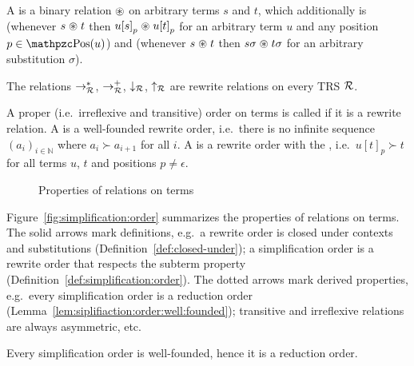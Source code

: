 %
\begin{definition}\label{def:closed-under}
	A  is a binary relation
	\( \mathrel{\circledast} \) on arbitrary terms \( s \) and \( t \),
	which additionally is 
	(whenever \( s\mathrel{\circledast} t \) then \( u{[s]}_p\mathrel{\circledast} u{[t]}_p \)
	for an arbitrary term \( u \) and any position \( p\in\pos(u) \))
	and 
	(whenever \( s\mathrel{\circledast} t \) then \( s\sigma\mathrel{\circledast} t\sigma \)
	for an arbitrary substitution \( \sigma \)).
\end{definition}
\begin{lemma}
	The relations \( \rightarrow^*_{\mathcal{R}} \),
	\( \rightarrow^+_{\mathcal{R}} \),
	\( \downarrow_{\mathcal{R}} \), \( \uparrow_{\mathcal{R}} \) are rewrite relations on every TRS \( \mathcal{R} \).
\end{lemma}
\begin{definition}\label{def:simplification:order}
	A proper (i.e.~irreflexive and transitive) order on terms is called  if it is a rewrite relation.
	A  is a well-founded rewrite order,
	i.e.~there is no infinite sequence
	\( {(a_i)}_{i\in\mathbb{N}} \)
	where \( a_i\succ a_{i+1} \) for all \( i \).
	A  is a rewrite order with the ,
	i.e.~\( u{[t]}_p \succ t \) for all terms \( u \), \( t \) and positions \( p\neq\epsilon \).
\end{definition}

\begin{figure}[htb]\label{fig:simplification:order}
	
	\caption{Properties of relations on terms}
\end{figure}

Figure~\vref{fig:simplification:order} summarizes the properties of relations on terms.
The solid arrows mark definitions,
e.g.~a rewrite order is closed under contexts and substitutions (Definition~\ref{def:closed-under});
a simplification order is a rewrite order
that respects the subterm property
(Definition~\ref{def:simplification:order}).
The dotted arrows mark derived properties,
e.g.~every simplification order is a reduction order
(Lemma~\ref{lem:siplifiaction:order:well:founded});
transitive and irreflexive relations are always asymmetric,
etc.

\begin{lemma}\label{lem:siplifiaction:order:well:founded}
	Every simplification order is well-founded, hence it is a reduction order.
\end{lemma}


